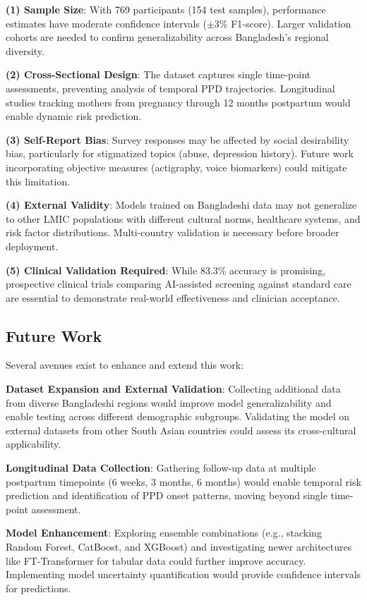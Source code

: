 \textbf{(1) Sample Size}: With 769 participants (154 test samples), performance estimates have moderate confidence intervals ($\pm$3\% F1-score). Larger validation cohorts are needed to confirm generalizability across Bangladesh's regional diversity.

\textbf{(2) Cross-Sectional Design}: The dataset captures single time-point assessments, preventing analysis of temporal PPD trajectories. Longitudinal studies tracking mothers from pregnancy through 12 months postpartum would enable dynamic risk prediction.

\textbf{(3) Self-Report Bias}: Survey responses may be affected by social desirability bias, particularly for stigmatized topics (abuse, depression history). Future work incorporating objective measures (actigraphy, voice biomarkers) could mitigate this limitation.

\textbf{(4) External Validity}: Models trained on Bangladeshi data may not generalize to other LMIC populations with different cultural norms, healthcare systems, and risk factor distributions. Multi-country validation is necessary before broader deployment.

\textbf{(5) Clinical Validation Required}: While 83.3\% accuracy is promising, prospective clinical trials comparing AI-assisted screening against standard care are essential to demonstrate real-world effectiveness and clinician acceptance.

\subsection{Future Work}

Several avenues exist to enhance and extend this work:

\textbf{Dataset Expansion and External Validation}: Collecting additional data from diverse Bangladeshi regions would improve model generalizability and enable testing across different demographic subgroups. Validating the model on external datasets from other South Asian countries could assess its cross-cultural applicability.

\textbf{Longitudinal Data Collection}: Gathering follow-up data at multiple postpartum timepoints (6 weeks, 3 months, 6 months) would enable temporal risk prediction and identification of PPD onset patterns, moving beyond single time-point assessment.

\textbf{Model Enhancement}: Exploring ensemble combinations (e.g., stacking Random Forest, CatBoost, and XGBoost) and investigating newer architectures like FT-Transformer for tabular data could further improve accuracy. Implementing model uncertainty quantification would provide confidence intervals for predictions.

